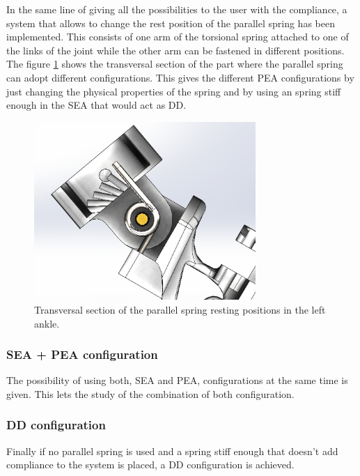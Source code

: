In the same line of giving all the possibilities to the user with the compliance, a system that allows to change the rest position of the parallel spring has been implemented.
This consists of one arm of the torsional spring attached to one of the links of the joint while the other arm can be fastened in different positions.
The figure \ref{fig:rotational_spring_rest_position} shows the transversal section of the part where the parallel spring can adopt different configurations. 
This gives the different PEA configurations by just changing the physical properties of the spring and by using an spring stiff enough in the SEA that would act as DD.

\begin{figure}[ht!]
	\centering
	\includegraphics[width=0.75\textwidth]{figures/rotational_spring_rest_positions}
	\caption{Transversal section of the parallel spring resting positions in the left ankle.}
	\label{fig:rotational_spring_rest_position}
\end{figure}

\subsubsection{SEA + PEA configuration} %
\label{ssub:sea_pea_configuration}
The possibility of using both, SEA and PEA, configurations at the same time is given.
This lets the study of the combination of both configuration.

\subsubsection{DD configuration } %
\label{ssub:dd_configuration}
Finally if no parallel spring is used and a spring stiff enough that doesn't add compliance to the system is placed, a DD configuration is achieved.


